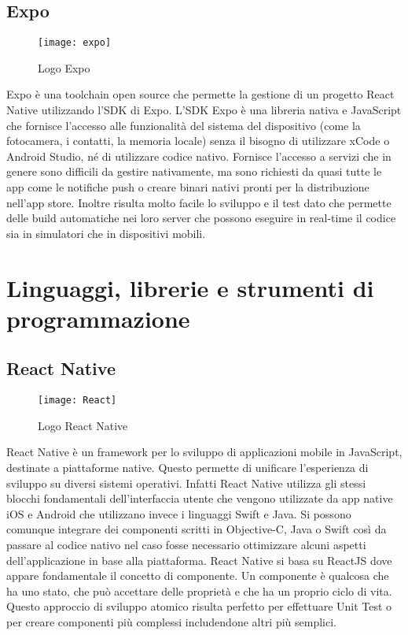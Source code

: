 \subsection{Expo} \label{subsec:expo}
	\begin{figure}[H] 
		\centering
		\texttt{[image: expo]}
		\caption{Logo Expo}
	\end{figure}
Expo è una toolchain open source che permette la gestione di un progetto React 
Native utilizzando l'SDK di Expo. L'SDK Expo è una libreria nativa e JavaScript 
che fornisce l'accesso alle funzionalità del sistema del dispositivo (come la 
fotocamera, i contatti, la memoria locale) senza il bisogno di utilizzare xCode 
o Android Studio, né di utilizzare codice nativo. Fornisce l'accesso a servizi 
che in genere sono difficili da gestire nativamente, ma sono richiesti da quasi 
tutte le app come le notifiche push o creare binari nativi pronti per la 
distribuzione nell'app store.
Inoltre risulta molto facile lo sviluppo e il test dato che permette delle 
build automatiche nei loro server che possono eseguire in real-time il codice 
sia in simulatori che in dispositivi mobili.


\section{Linguaggi, librerie e strumenti di programmazione}

\subsection{React Native}
\begin{figure}[H] 
	\centering
	\texttt{[image: React]}
	\caption{Logo React Native}
\end{figure}
React Native è un framework per lo sviluppo di applicazioni mobile in
JavaScript, destinate a piattaforme native. Questo permette di 
unificare l'esperienza di sviluppo su diversi sistemi operativi. Infatti React 
Native utilizza gli stessi blocchi fondamentali dell'interfaccia utente che 
vengono utilizzate da app native iOS e Android che utilizzano invece i 
linguaggi Swift e Java.
Si possono comunque integrare dei componenti scritti in Objective-C, 
Java o Swift così da passare al codice nativo nel caso fosse necessario 
ottimizzare alcuni aspetti dell'applicazione in base alla piattaforma. 
React Native si basa su ReactJS dove appare fondamentale il concetto di 
componente. Un componente è qualcosa che ha uno stato, che può accettare 
delle proprietà e che ha un proprio ciclo di vita. Questo approccio di 
sviluppo atomico risulta perfetto per effettuare Unit Test o per creare 
componenti più complessi includendone altri più semplici.

